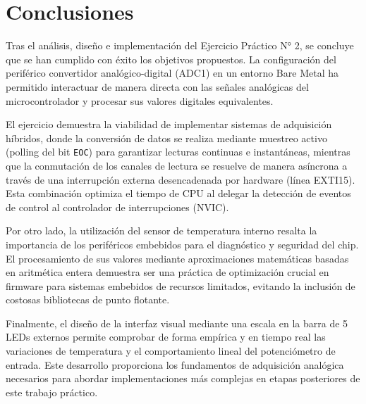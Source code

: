 \chapter{Conclusiones}
\label{ch:conclusiones}

Tras el análisis, diseño e implementación del Ejercicio Práctico N° 2, se concluye que se han cumplido con éxito los
objetivos propuestos. La configuración del periférico convertidor analógico-digital (ADC1) en un entorno Bare Metal ha
permitido interactuar de manera directa con las señales analógicas del microcontrolador y procesar sus valores
digitales equivalentes.

El ejercicio demuestra la viabilidad de implementar sistemas de adquisición híbridos, donde la conversión de datos se
realiza mediante muestreo activo (polling del bit \texttt{EOC}) para garantizar lecturas continuas e instantáneas,
mientras que la conmutación de los canales de lectura se resuelve de manera asíncrona a través de una interrupción
externa desencadenada por hardware (línea EXTI15). Esta combinación optimiza el tiempo de CPU al delegar la detección
de eventos de control al controlador de interrupciones (NVIC).

Por otro lado, la utilización del sensor de temperatura interno resalta la importancia de los periféricos embebidos
para el diagnóstico y seguridad del chip. El procesamiento de sus valores mediante aproximaciones matemáticas basadas
en aritmética entera demuestra ser una práctica de optimización crucial en firmware para sistemas embebidos de recursos
limitados, evitando la inclusión de costosas bibliotecas de punto flotante.

Finalmente, el diseño de la interfaz visual mediante una escala en la barra de 5 LEDs externos permite comprobar de
forma empírica y en tiempo real las variaciones de temperatura y el comportamiento lineal del potenciómetro de entrada.
Este desarrollo proporciona los fundamentos de adquisición analógica necesarios para abordar implementaciones más
complejas en etapas posteriores de este trabajo práctico.
